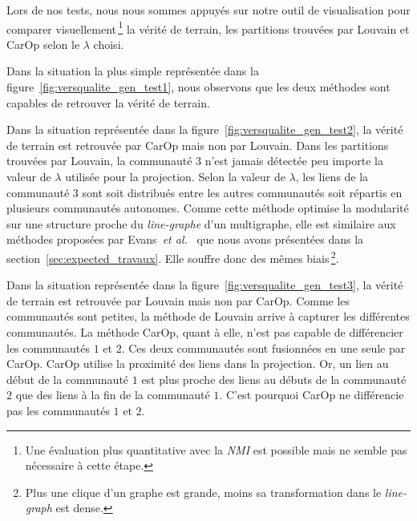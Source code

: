 Lors de nos tests,  nous nous sommes appuyés sur notre outil de visualisation pour comparer visuellement\,\footnote{Une évaluation plus quantitative avec la \emph{NMI} est possible mais ne semble pas nécessaire à cette étape.} la vérité de terrain, les partitions trouvées par Louvain et CarOp selon le $\lambda$ choisi.

\bigskip

Dans la situation la plus simple représentée dans la figure~\ref{fig:versqualite_gen_test1}, nous observons que les deux méthodes sont capables de retrouver la vérité de terrain.

Dans la situation représentée dans la figure~\ref{fig:versqualite_gen_test2}, la vérité de terrain est retrouvée par CarOp mais non par Louvain.
Dans les partitions trouvées par Louvain, la communauté $3$ n'est jamais détectée peu importe la valeur de $\lambda$ utilisée pour la projection.
Selon la valeur de $\lambda$, les liens de la communauté $3$ sont soit distribués entre les autres communautés soit répartis en plusieurs communautés autonomes.
Comme cette méthode optimise la modularité sur une structure proche du \emph{line-graphe} d'un multigraphe, elle est similaire aux méthodes proposées par Evans~\emph{et al.}~\cite{Evans2009} que nous avons présentées dans la section~\ref{sec:expected_travaux}.
Elle souffre donc des mêmes biais\,\footnote{Plus une clique d'un graphe est grande, moins sa transformation dans le \emph{line-graph} est dense.}.

Dans la situation représentée dans la figure~\ref{fig:versqualite_gen_test3}, la vérité de terrain est retrouvée par Louvain mais non par CarOp.
Comme les communautés sont petites, la méthode de Louvain arrive à capturer les différentes communautés.
La méthode CarOp, quant à elle, n'est pas capable de différencier les communautés $1$ et $2$.
Ces deux communautés sont fusionnées en une seule par CarOp.
CarOp utilise la proximité des liens dans la projection.
Or, un lien au début de la communauté $1$ est plus proche des liens au débuts de la communauté $2$ que des liens à la fin de la communauté $1$.
C'est pourquoi CarOp ne différencie pas les communautés $1$ et $2$.




